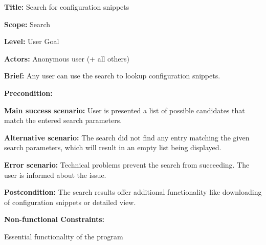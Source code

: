 
\begin{DoxyItemize}
\item {\bfseries{Title\+:}} Search for configuration snippets
\item {\bfseries{Scope\+:}} Search
\item {\bfseries{Level\+:}} User Goal
\item {\bfseries{Actors\+:}} Anonymous user (+ all others)
\item {\bfseries{Brief\+:}} Any user can use the search to lookup configuration snippets.
\end{DoxyItemize}


\begin{DoxyItemize}
\item {\bfseries{Precondition\+:}}
\item {\bfseries{Main success scenario\+:}} User is presented a list of possible candidates that match the entered search parameters.
\item {\bfseries{Alternative scenario\+:}} The search did not find any entry matching the given search parameters, which will result in an empty list being displayed.
\item {\bfseries{Error scenario\+:}} Technical problems prevent the search from succeeding. The user is informed about the issue.
\item {\bfseries{Postcondition\+:}} The search results offer additional functionality like downloading of configuration snippets or detailed view.
\item {\bfseries{Non-\/functional Constraints\+:}}
\begin{DoxyItemize}
\item Essential functionality of the program 
\end{DoxyItemize}
\end{DoxyItemize}